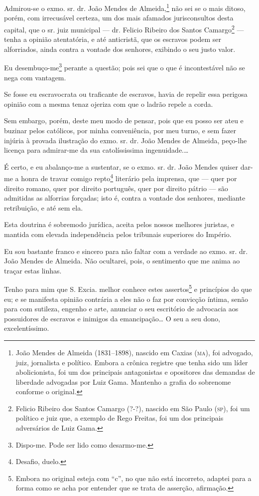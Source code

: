 {Admirou-se o exmo. sr. dr. João Mendes de
Almeida,\footnote{ João Mendes de Almeida
  (1831--1898), nascido em Caxias (\textsc{ma}), foi advogado, juiz, jornalista e
  político. Embora a crônica registre que tenha sido um líder
  abolicionista, foi um dos principais antagonistas e opositores das
  demandas de liberdade advogadas por Luiz Gama. Mantenho a grafia do
  sobrenome conforme o original.} não sei se o mais ditoso, porém, com
irrecusável certeza, um dos mais afamados jurisconsultos desta capital,
que o sr. juiz municipal --- dr. Felicio Ribeiro dos Santos
Camargo\footnote{ Felicio Ribeiro dos Santos Camargo (?-?), nascido
  em São Paulo (\textsc{sp}), foi um político e juiz que, a exemplo de Rego
  Freitas, foi um dos principais adversários de Luiz Gama.} --- tenha a
opinião atentatória, e até anticristã, que os escravos podem ser
alforriados, ainda contra a vontade dos senhores, exibindo o seu justo
valor.

Eu desembuço-me\footnote{ Dispo-me. Pode ser lido como desarmo-me.}
perante a questão; pois sei que o que é incontestável não se nega com
vantagem.

Se fosse eu escravocrata ou traficante de escravos, havia de repelir
essa perigosa opinião com a mesma tenaz ojeriza com que o ladrão repele
a corda.

Sem embargo, porém, deste meu modo de pensar, pois que eu posso ser ateu
e buzinar pelos católicos, por minha conveniência, por meu turno, e sem
fazer injúria à provada ilustração do exmo. sr. dr. João Mendes de
Almeida, peço-lhe licença para admirar-me da sua catolíssissima
ingenuidade.\ldots{}

É certo, e eu abalanço-me a sustentar, se o exmo. sr. dr. João Mendes
quiser dar-me a honra de travar comigo repto\footnote{ Desafio,
  duelo.} literário pela imprensa, que --- quer por direito romano, quer
por direito português, quer por direito pátrio --- são admitidas as
alforrias forçadas; isto é, contra a vontade dos senhores, mediante
retribuição, e até sem ela.

Esta doutrina é sobremodo jurídica, aceita pelos nossos melhores
juristas, e mantida com elevada independência pelos tribunais superiores
do Império.

Eu sou bastante franco e sincero para não faltar com a verdade ao exmo.
sr. dr. João Mendes de Almeida. Não ocultarei, pois, o sentimento que me
anima ao traçar estas linhas.

Tenho para mim que S. Excia. melhor conhece estes assertos\footnote{
  Embora no original esteja com ``c'', no que não está incorreto,
  adaptei para a forma como se acha por entender que se trata de
  asserção, afirmação.} e princípios do que eu; e se manifesta opinião
contrária a eles não o faz por convicção íntima, senão para com
sutileza, engenho e arte, anunciar o seu escritório de advocacia aos
possuidores de escravos e inimigos da emancipação\ldots{} O seu a seu dono,
excelentíssimo.

}
